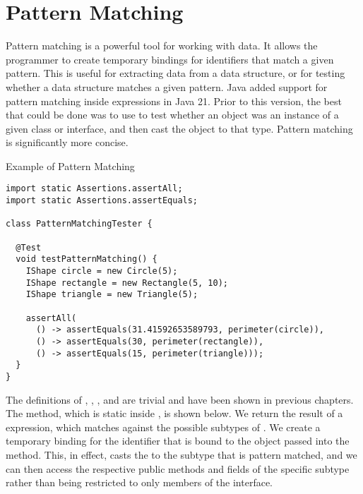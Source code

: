 \section{Pattern Matching}

Pattern matching is a powerful tool for working with data. It allows the programmer to create temporary bindings for identifiers that match a given pattern. This is useful for extracting data from a data structure, or for testing whether a data structure matches a given pattern. Java added support for pattern matching inside  expressions in Java 21. Prior to this version, the best that could be done was to use  to test whether an object was an instance of a given class or interface, and then cast the object to that type. Pattern matching is significantly more concise.


\begin{cl}[]{Example of Pattern Matching}
\begin{lstlisting}[language=MyJava]
import static Assertions.assertAll;
import static Assertions.assertEquals;

class PatternMatchingTester {

  @Test
  void testPatternMatching() {
    IShape circle = new Circle(5);
    IShape rectangle = new Rectangle(5, 10);
    IShape triangle = new Triangle(5);

    assertAll(
      () -> assertEquals(31.41592653589793, perimeter(circle)),
      () -> assertEquals(30, perimeter(rectangle)),
      () -> assertEquals(15, perimeter(triangle)));
  }
}
\end{lstlisting}
\end{cl}

The definitions of , , , and  are trivial and have been shown in previous chapters. The  method, which is static inside , is shown below. We return the result of a  expression, which matches against the possible subtypes of . We create a temporary binding for the identifier  that is bound to the  object passed into the method. This, in effect, casts the  to the subtype that is pattern matched, and we can then access the respective public methods and fields of the specific subtype rather than being restricted to only members of the  interface.

